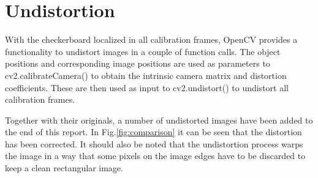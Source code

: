 \documentclass[bibliography=totoc]{scrartcl}
\begin{document}
\section{Undistortion}
With the checkerboard localized in all calibration frames, OpenCV provides a functionality to undistort images in a couple of function calls.
The object positions and corresponding image positions are used as parameters to cv2.calibrateCamera() to obtain the intrinsic camera matrix and distortion coefficients.
These are then used as input to cv2.undistort() to undistort all calibration frames.

Together with their originals, a number of undistorted images have been added to the end of this report.
In Fig.\ref{fig:comparison} it can be seen that the distortion has been corrected.
It should also be noted that the undistortion process warps the image in a way that some pixels on the image edges have to be discarded to keep a clean rectangular image.
\end{document}
